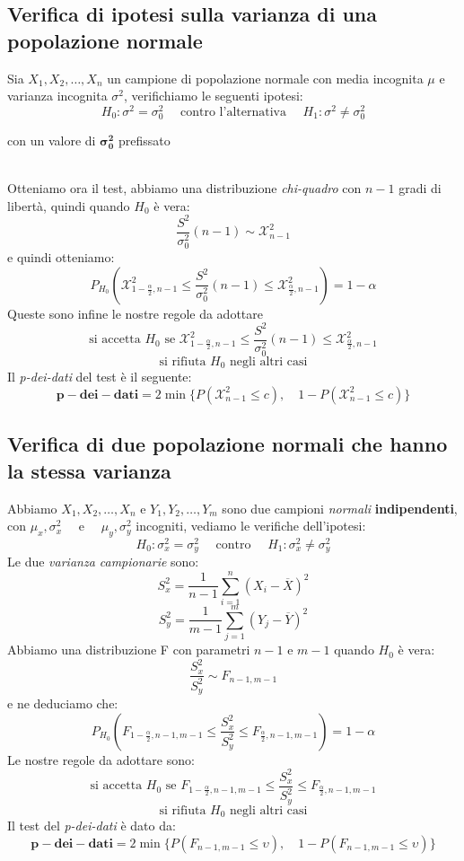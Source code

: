 \documentclass[]{article}
\begin{document}
    \subsection{Verifica di ipotesi sulla varianza di una popolazione normale}
    Sia $X_1, X_2, \ldots, X_n$ un campione di popolazione normale con media incognita $\mu$ e varianza incognita $\sigma^2$, verifichiamo le seguenti ipotesi:
    \[ H_0 : \sigma^2 = \sigma^2_0 \quad \text{ contro l'alternativa } \quad H_1 : \sigma^2 \not = \sigma^2_0 \]
    \centerline{con un valore di $\boldsymbol{\sigma^2_0}$ prefissato} \\[2ex]
    Otteniamo ora il test, abbiamo una distribuzione \textit{chi-quadro} con $n-1$ gradi di libertà, quindi quando $H_0$ è vera:\
    \[ \frac{S^2}{\sigma^2_0}(n-1) \sim \mathcal{X}^2_{n-1} \]
    e quindi otteniamo:
    \[ P_{H_0} \left( \mathcal{X}^2_{1- \frac{\alpha}{2}, n-1} \leq \frac{S^2}{\sigma^2_0} (n-1) \leq \mathcal{X}^2_{\frac{\alpha}{2}, n -1} \right) = 1 - \alpha \]
    Queste sono infine le nostre regole da adottare
    \[ \text{si accetta } H_0 \text{ se } \mathcal{X}^2_{1-\frac{\alpha}{2}, n-1} \leq \frac{S^2}{\sigma^2_0} (n-1) \leq \mathcal{X}^2_{\frac{\alpha}{2}, n-1} \]
    \[ \text{si rifiuta } H_0 \text{ negli altri casi} \]
    Il \textit{p-dei-dati} del test è il seguente:
    \[ \boldsymbol{p-dei-dati} = 2 \min \{P(\mathcal{X}^2_{n-1} \leq c), \quad 1-P(\mathcal{X}^2_{n-1} \leq c)\} \]
    \subsection{Verifica di due popolazione normali che hanno la stessa varianza}
    Abbiamo $X_1, X_2, \ldots, X_n$ e $Y_1, Y_2,\ldots, Y_m$ sono due campioni \textit{normali} \textbf{indipendenti}, con $\mu_x, \sigma^2_x \quad$ e $\quad \mu_y, \sigma^2_y$ incogniti, vediamo le verifiche dell'ipotesi:
    \[ H_0 : \sigma^2_x = \sigma^2_y \quad \text{ contro } \quad H_1 : \sigma^2_x \not = \sigma^2_y \]
    Le due \textit{varianza campionarie} sono:
    \[ S^2_x = \frac{1}{n-1} \sum_{i=1}^{n} (X_i - \overline{X})^2 \]
    \[ S^2_y = \frac{1}{m-1} \sum_{j=1}^{m} (Y_j - \overline{Y})^2 \]
    Abbiamo una distribuzione F con parametri $n-1$ e $m-1$ quando $H_0$ è vera:
    \[ \frac{S^2_x}{S^2_y} \sim F_{n-1, m-1} \]
    e ne deduciamo che:
    \[ P_{H_0} \left( F_{1- \frac{\alpha}{2}, n-1, m-1} \leq \frac{S^2_x}{S^2_y} \leq F_{\frac{\alpha}{2}, n-1, m-1} \right) = 1 - \alpha \]
    Le nostre regole da adottare sono:
    \[ \text{si accetta } H_0 \text{ se } F_{1-\frac{\alpha}{2}, n-1, m-1} \leq \frac{S^2_x}{S^2_y} \leq F_{\frac{\alpha}{2}, n-1, m-1} \]
    \[ \text{si rifiuta } H_0 \text{ negli altri casi} \]
    Il test del \textit{p-dei-dati} è dato da:
    \[ \boldsymbol{p-dei-dati} = 2\min \{ P(F_{n-1,m-1} \leq \upsilon), \quad 1-P(F_{n-1,m-1} \leq \upsilon )\} \]
\end{document}
